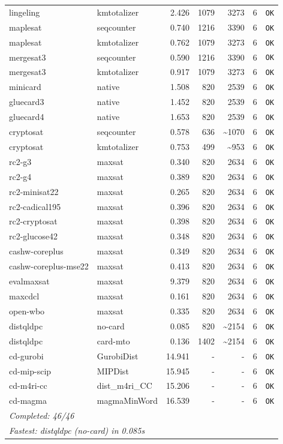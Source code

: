 \begin{longtable}{llrrrl p{}}
lingeling & kmtotalizer & 2.426 & 1079 & 3273 & 6 & \texttt{OK} \\
maplesat & seqcounter & 0.740 & 1216 & 3390 & 6 & \texttt{OK} \\
maplesat & kmtotalizer & 0.762 & 1079 & 3273 & 6 & \texttt{OK} \\
mergesat3 & seqcounter & 0.590 & 1216 & 3390 & 6 & \texttt{OK} \\
mergesat3 & kmtotalizer & 0.917 & 1079 & 3273 & 6 & \texttt{OK} \\
minicard & native & 1.508 & 820 & 2539 & 6 & \texttt{OK} \\
gluecard3 & native & 1.452 & 820 & 2539 & 6 & \texttt{OK} \\
gluecard4 & native & 1.653 & 820 & 2539 & 6 & \texttt{OK} \\
cryptosat & seqcounter & 0.578 & 636 & \textasciitilde{}1070 & 6 & \texttt{OK} \\
cryptosat & kmtotalizer & 0.753 & 499 & \textasciitilde{}953 & 6 & \texttt{OK} \\
rc2-g3 & maxsat & 0.340 & 820 & 2634 & 6 & \texttt{OK} \\
rc2-g4 & maxsat & 0.389 & 820 & 2634 & 6 & \texttt{OK} \\
rc2-minisat22 & maxsat & 0.265 & 820 & 2634 & 6 & \texttt{OK} \\
rc2-cadical195 & maxsat & 0.396 & 820 & 2634 & 6 & \texttt{OK} \\
rc2-cryptosat & maxsat & 0.398 & 820 & 2634 & 6 & \texttt{OK} \\
rc2-glucose42 & maxsat & 0.348 & 820 & 2634 & 6 & \texttt{OK} \\
cashw-coreplus & maxsat & 0.349 & 820 & 2634 & 6 & \texttt{OK} \\
cashw-coreplus-mse22 & maxsat & 0.413 & 820 & 2634 & 6 & \texttt{OK} \\
evalmaxsat & maxsat & 9.379 & 820 & 2634 & 6 & \texttt{OK} \\
maxcdcl & maxsat & 0.161 & 820 & 2634 & 6 & \texttt{OK} \\
open-wbo & maxsat & 0.335 & 820 & 2634 & 6 & \texttt{OK} \\
distqldpc & no-card & 0.085 & 820 & \textasciitilde{}2154 & 6 & \texttt{OK} \\
distqldpc & card-mto & 0.136 & 1402 & \textasciitilde{}2154 & 6 & \texttt{OK} \\
cd-gurobi & GurobiDist & 14.941 & - & - & 6 & \texttt{OK} \\
cd-mip-scip & MIPDist & 15.945 & - & - & 6 & \texttt{OK} \\
cd-m4ri-cc & dist\_m4ri\_CC & 15.206 & - & - & 6 & \texttt{OK} \\
cd-magma & magmaMinWord & 16.539 & - & - & 6 & \texttt{OK} \\
\midrule
\multicolumn{7}{l}{\textit{Completed: 46/46}} \\
\multicolumn{7}{l}{\textit{Fastest: distqldpc (no-card) in 0.085s}} \\
\end{longtable}
